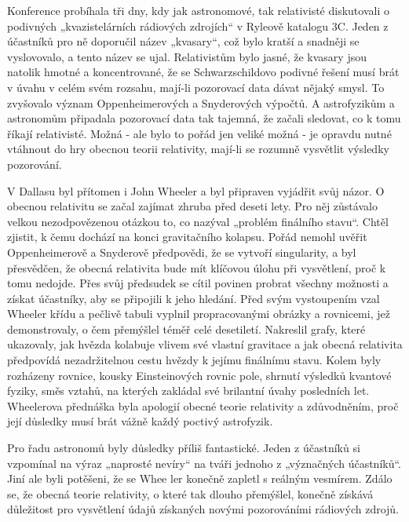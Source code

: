   Konference probíhala tři dny, kdy jak astronomové, tak relativisté diskutovali o podivných
  „kvazistelárních rádiových zdrojích“ v Ryleově katalogu 3C. Jeden z účastníků pro ně doporučil
  název „kvasary“, což bylo kratší a snadněji se vyslovovalo, a tento název se ujal. Relativistům
  bylo jasné, že kvasary jsou natolik hmotné a koncentrované, že se Schwarzschildovo podivné řešení
  musí brát v úvahu v celém svém rozsahu, mají-li pozorovací data dávat nějaký smysl. To zvyšovalo
  význam Oppenheimerových a Snyderových výpočtů. A astrofyzikům a astronomům připadala pozorovací
  data tak tajemná, že začali sledovat, co k tomu říkají relativisté. Možná - ale bylo to pořád jen
  veliké možná - je opravdu nutné vtáhnout do hry obecnou teorii relativity, mají-li se rozumně
  vysvětlit výsledky pozorování. 

  V Dallasu byl přítomen i John Wheeler a byl připraven vyjádřit svůj názor. O obecnou relativitu se
  začal zajímat zhruba před deseti lety. Pro něj zůstávalo velkou nezodpovězenou otázkou to, co
  nazýval „problém finálního stavu“. Chtěl zjistit, k čemu dochází na konci gravitačního kolapsu.
  Pořád nemohl uvěřit Oppenheimerově a Snyderově předpovědi, že se vytvoří singularity, a byl
  přesvědčen, že obecná relativita bude mít klíčovou úlohu při vysvětlení, proč k tomu nedojde. Přes
  svůj předsudek se cítil povinen probrat všechny možnosti a získat účastníky, aby se připojili k
  jeho hledání. Před svým vystoupením vzal Wheeler křídu a pečlivě tabuli vyplnil propracovanými
  obrázky a rovnicemi, jež demonstrovaly, o čem přemýšlel téměř celé desetiletí. Nakreslil grafy,
  které ukazovaly, jak hvězda kolabuje vlivem své vlastní gravitace a jak obecná relativita
  předpovídá nezadržitelnou cestu hvězdy k jejímu finálnímu stavu. Kolem byly rozházeny rovnice,
  kousky Einsteinových rovnic pole, shrnutí výsledků kvantové fyziky, směs vztahů, na kterých
  zakládal své brilantní úvahy posledních let. Wheelerova přednáška byla apologií obecné teorie
  relativity a zdůvodněním, proč její důsledky musí brát vážně každý poctivý astrofyzik.

  Pro řadu astronomů byly důsledky příliš fantastické. Jeden z účastníků si vzpomínal na výraz
  „naprosté nevíry“ na tváři jednoho z „význačných účastníků“. Jiní ale byli potěšeni, že se Whee
  ler konečně zapletl s reálným vesmírem. Zdálo se, že obecná teorie relativity, o které tak dlouho
  přemýšlel, konečně získává důležitost pro vysvětlení údajů získaných novými pozorováními
  rádiových zdrojů. 


